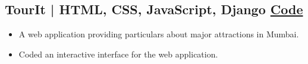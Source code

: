 \documentclass[10pt]{article}
\newenvironment{zitemize}{
\begin{itemize}\itemsep2pt \parskip0pt \parsep1pt}
{\end{itemize}\vspace{-0.5cm}}
\begin{document}
\subsection*{ TourIt | HTML, CSS, JavaScript, Django \hfill \href{https://github.com/mihikagaonkar/tourit}{Code}} 
    \begin{zitemize}
        \item A  web  application  providing  particulars  about  major attractions in Mumbai.
        \item Coded an interactive interface for the web application.
    \end{zitemize}




\end{document}
